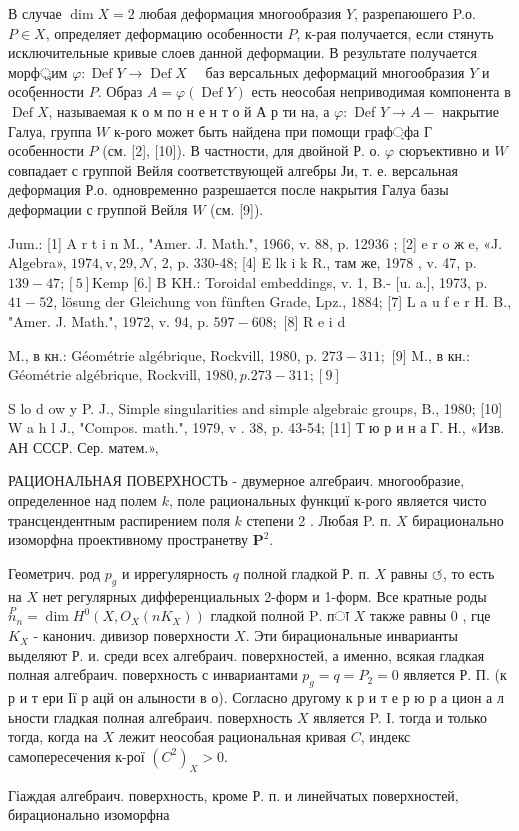 \documentclass[10pt]{article}
\begin{document}
В случае $\operatorname{dim} X=2$ любая деформация многообразия $Y$, разрепаюшего P.о. $P \in X$, определяет деформацию особенности $P$, к-рая получается, если стянуть исключительные кривые слоев данной деформации. В результате получается морф্রим $\varphi: \operatorname{Def} Y \rightarrow \operatorname{Def} X \quad$ баз версальных деформаций многообразия $Y$ и особุенности $P$. Образ $A=\varphi(\operatorname{Def} Y)$ есть неособая неприводимая компонента в $\operatorname{Def} X$, называемая к о м по н е н т о й А р ти на, а $\varphi:$ Def $Y \rightarrow A-$ накрытие Галуа, группа $W$ к-рого может быть найдена при помощи граф্фа Г особенности $P$ (см. [2], [10]). В частности, для двойной Р. о. $\varphi$ сюръективно и $W$ совпадает с группой Вейля соответствующей алгебры Ји, т. е. версальная деформация Р.о. одновременно разрешается после накрытия Галуа базы деформации с группой Вейля $W$ (см. [9]).



Jum.: [1] A r t i n M., "Amer. J. Math.", 1966, v. 88, p. 12936 ; [2] e r o ж e, «J. Algebra», $1974, \mathrm{v}, 29, \mathcal{N}$, 2, p. 330-48; [4] E lk i k R., там же, 1978 , v. 47, p. $139-47 ;[5] \mathrm{K} \mathrm{e} \mathrm{m} \mathrm{p}$ [6.] B KH.: Toroidal embeddings, v. 1, B.- [u. a.], 1973, p. $41-52$, lösung der Gleichung von fünften Grade, Lpz., 1884; [7] L a u f e r H. B., "Amer. J. Math.", 1972, v. 94, p. $597-608 ;$ [8] R e i d

M., в кн.: Géométrie algébrique, Rockvill, 1980, p. $273-311 ;$ [9] M., в кн.: Géométrie algébrique, Rockvill, $1980, p .273-311 ;[9]$

S lo d ow y P. J., Simple singularities and simple algebraic groups, B., 1980; [10] W a h l J., "Compos. math.", 1979, v . 38, p. 43-54; [11] Т ю р и н а Г. Н., «Изв. АН СССР. Сер. матем.»,



РАЦИОНАЛЬНАЯ ПОВЕРХНОСТЬ - двумерное алгебраич. многообразие, определенное над полем $k$, поле рациональных функциї к-рого является чисто трансцендентным распирением поля $k$ степени 2 . Любая P. п. $X$ бирационально изоморфна проективному пространетву $\mathbf{P}^{2}$.



Геометрич. род $p_{g}$ и иррегулярность $q$ полной гладкой Р. п. $X$ равны $\circlearrowleft$, то есть на $X$ нет регулярных дифференциальных 2-форм и 1-форм. Все кратные роды $\stackrel{P}{n}_{n}=\operatorname{dim} H^{0}\left(X, O_{X}\left(n K_{X}\right)\right)$ гладкой полной $\mathrm{P}$. пा $X$ также равны 0 , гце $K_{X}$ - канонич. дивизор поверхности $X$. Эти бирациональные инварианты выделяют Р. и. среди всех алгебраич. поверхностей, а именно, всякая гладкая полная алгебраич. поверхность с инвариантами $p_{g}=q=P_{2}=0$ является Р. П. (к р и т ери Ії р ацй он алыности в о). Согласно другому к р и т е р ю р а цион а л ьности гладкая полная алгебраич. поверхность $X$ является P. І. тогда и только тогда, когда на $X$ лежит неособая рациональная кривая $C$, индекс самопересечения к-рої $\left(C^{2}\right)_{X}>0$.



Гіаждая алгебраич. поверхность, кроме Р. п. и линейчатых поверхностей, бирационально изоморфна
\end{document}
